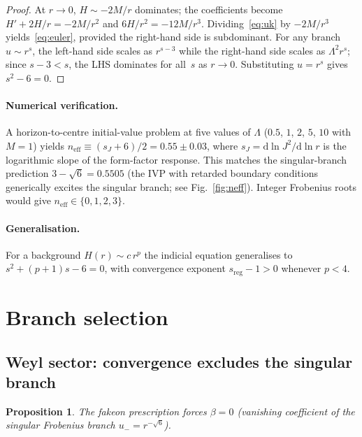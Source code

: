 \documentclass[a4paper,12pt]{article}
\newtheorem{proposition}{Proposition}
\newcommand{\Lam}{\Lambda}
\newcommand{\dd}{\mathrm{d}}
\begin{document}
\begin{proof}
At $r\to 0$, $H\sim -2M/r$ dominates; the coefficients become
$H'+2H/r=-2M/r^2$ and $6H/r^2=-12M/r^3$.
Dividing~\eqref{eq:uk} by $-2M/r^3$ yields~\eqref{eq:euler},
provided the right-hand side is subdominant.
For any branch $u\sim r^s$, the left-hand side scales as
$r^{s-3}$ while the right-hand side scales as $\Lam^2 r^s$;
since $s-3<s$, the LHS dominates for all~$s$ as $r\to 0$.
Substituting $u=r^s$ gives $s^2-6=0$.
\end{proof}

\paragraph{Numerical verification.}
A horizon-to-centre initial-value problem at five values of
$\Lam$ ($0.5$, $1$, $2$, $5$, $10$ with $M=1$) yields
$n_{\mathrm{eff}}\equiv (s_J+6)/2 = 0.55\pm0.03$,
where $s_J=\dd\ln J^2/\dd\ln r$ is the logarithmic slope of the
form-factor response.
This matches the singular-branch prediction
$3-\sqrt{6}=0.5505$ (the IVP with retarded boundary conditions
generically excites the singular branch; see Fig.~\ref{fig:neff}).
Integer Frobenius roots would give $n_{\mathrm{eff}}\in\{0,1,2,3\}$.

\paragraph{Generalisation.}
For a background $H(r)\sim c\,r^p$ the indicial equation generalises to
$s^2+(p+1)s-6=0$, with convergence exponent $s_{\mathrm{reg}}-1>0$
whenever $p<4$.

\section{Branch selection}\label{sec:branch}

\subsection{Weyl sector: convergence excludes the singular branch}

\begin{proposition}\label{prop:weyl}
The fakeon prescription forces $\beta=0$
(vanishing coefficient of the singular Frobenius branch $u_-=r^{-\sqrt{6}}$).
\end{proposition}
\end{document}

